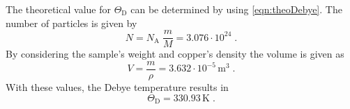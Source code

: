 The theoretical value for $\Theta _{\text{D}}$ can be determined by using \autoref{eqn:theoDebye}.
The number of particles is given by 
\begin{equation*}
    N=N_{\text{A}}\; \frac{m}{M}=3.076 \cdot 10^{24}\; .
\end{equation*}
By considering the sample's weight and copper's density the volume is given as 
\begin{equation*}
    V=\frac{m}{\rho}=3.632 \cdot 10^{-5} \, \unit{\meter}^3\; .
\end{equation*}
With these values, the Debye temperature results in
\begin{equation*}  
    \Theta_{\text{D}}=330.93\, \unit{\kelvin}\; .
\end{equation*}